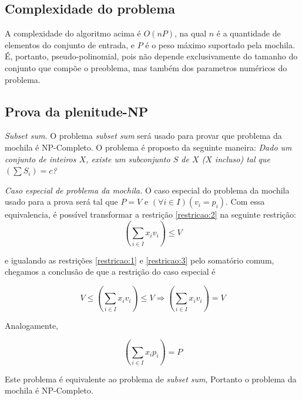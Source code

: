 \documentclass[a4paper]{article}
\begin{document}
\subsection*{Complexidade do problema}
A complexidade do algoritmo acima é $O(nP)$, na qual $n$ é a quantidade de elementos do conjunto de entrada, e $P$ é o peso máximo suportado pela mochila. É, portanto, pseudo-polinomial, pois não depende exclusivamente do tamanho do conjunto que compõe o preoblema, mas também dos parametros numéricos do problema.

\subsection*{Prova da plenitude-NP}
{\it Subset sum.} O problema {\it subset sum} será usado para provar que problema da mochila é NP-Completo. O problema é proposto da seguinte maneira: {\it Dado um conjunto de inteiros $X$, existe um subconjunto $S$ de $X$ ($X$ incluso) tal que $\left(\sum S_i\right) = c$?}

{\it Caso especial de problema da mochila.} O caso especial do problema da mochila usado para a prova será tal que $P = V$ e $(\forall i \in I)(v_i=p_i)$. Com essa equivalencia, é possível transformar a restrição \ref{restricao:2} na seguinte restrição:
\begin{equation}
\label{restricao:3}
\left(\sum_{i \in I} x_i v_i\right) \le V
\end{equation}

e igualando as restrições \ref{restricao:1} e \ref{restricao:3} pelo somatório comum, chegamos a conclusão de que a restrição do caso especial é

\begin{equation}
\label{restricao:especial}
V \le \left(\sum_{i \in I} x_i v_i\right) \le V \Rightarrow \left(\sum_{i \in I} x_i v_i\right) = V
\end{equation}

Analogamente,

\begin{equation}
\label{restricao:especial_analoga}
\left(\sum_{i \in I} x_i p_i\right) = P
\end{equation}

Este problema é equivalente ao problema de {\it subset sum}, Portanto o problema da mochila é NP-Completo.
\end{document}
